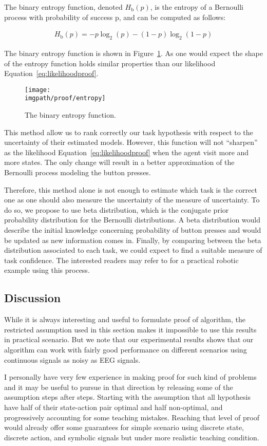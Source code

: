 The binary entropy function, denoted $H_{\mathrm b}(p)$, is the entropy of a Bernoulli process with probability of success p, and can be computed as follows:

\begin{eqnarray}
H_{\mathrm b}(p) = -p\log_2(p) - (1-p)\log_2(1-p) 
\label{eq:likelihoodentropy}
\end{eqnarray}

The binary entropy function is shown in Figure~\ref{fig:prooflikelihoodentropy}. As one would expect the shape of the entropy function holds similar properties than our likelihood Equation~\ref{eq:likelihoodproof}.
    
\begin{figure}[!ht]
\centering
\texttt{[image: \\imgpath/proof/entropy]}
\caption{The binary entropy function.}
\label{fig:prooflikelihoodentropy}
\end{figure}

This method allow us to rank correctly our task hypothesis with respect to the uncertainty of their estimated models. However, this function will not ``sharpen'' as the likelihood Equation~\ref{eq:likelihoodproof} when the agent visit more and more states. The only change will result in a better approximation of the Bernoulli process modeling the button presses.

Therefore, this method alone is not enough to estimate which task is the correct one as one should also measure the uncertainty of the measure of uncertainty. To do so, we propose to use beta distribution, which is the conjugate prior probability distribution for the Bernoulli distributions. A beta distribution would describe the initial knowledge concerning probability of button presses and would be updated as new information comes in. Finally, by comparing between the beta distribution associated to each task, we could expect to find a suitable measure of task confidence. The interested readers may refer to \cite{montesano2012active} for a practical robotic example using this process.

\subsection{Discussion}

While it is always interesting and useful to formulate proof of algorithm, the restricted assumption used in this section makes it impossible to use this results in practical scenario. But we note that our experimental results shows that our algorithm can work with fairly good performance on different scenarios using continuous signals as noisy as EEG signals.

I personally have very few experience in making proof for such kind of problems and it may be useful to pursue in that direction by releasing some of the assumption steps after steps. Starting with the assumption that all hypothesis have half of their state-action pair optimal and half non-optimal, and progressively accounting for some teaching mistakes. Reaching that level of proof would already offer some guarantees for simple scenario using discrete state, discrete action, and symbolic signals but under more realistic teaching condition.
